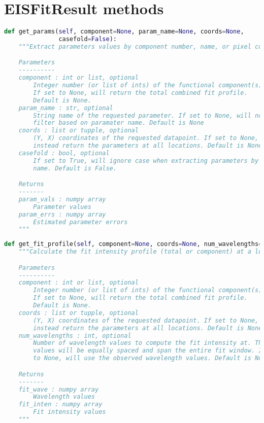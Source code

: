 \section{EISFitResult methods}
\label{sec:EISFitResult}
\begin{lstlisting}[language=Python]
def get_params(self, component=None, param_name=None, coords=None,
               casefold=False):
    """Extract parameters values by component number, name, or pixel coords

    Parameters
    ----------
    component : int or list, optional
        Integer number (or list of ints) of the functional component(s).
        If set to None, will return the total combined fit profile.
        Default is None.
    param_name : str, optional
        String name of the requested parameter. If set to None, will not
        filter based on paramater name. Default is None
    coords : list or tupple, optional
        (Y, X) coordinates of the requested datapoint. If set to None, will
        instead return the parameters at all locations. Default is None
    casefold : bool, optional
        If set to True, will ignore case when extracting parameters by
        name. Default is False.

    Returns
    -------
    param_vals : numpy array
        Parameter values
    param_errs : numpy array
        Estimated parameter errors
    """
\end{lstlisting}

\begin{lstlisting}[language=Python]
def get_fit_profile(self, component=None, coords=None, num_wavelengths=None):
    """Calculate the fit intensity profile (total or component) at a location.

    Parameters
    ----------
    component : int or list, optional
        Integer number (or list of ints) of the functional component(s).
        If set to None, will return the total combined fit profile.
        Default is None.
    coords : list or tupple, optional
        (Y, X) coordinates of the requested datapoint. If set to None, will
        instead return the parameters at all locations. Default is None
    num_wavelengths : int, optional
        Number of wavelength values to compute the fit intensity at. These
        values will be equally spaced and span the entire fit window. If set
        to None, will use the observed wavelength values. Default is None.

    Returns
    -------
    fit_wave : numpy array
        Wavelength values
    fit_inten : numpy array
        Fit intensity values
    """
\end{lstlisting}

